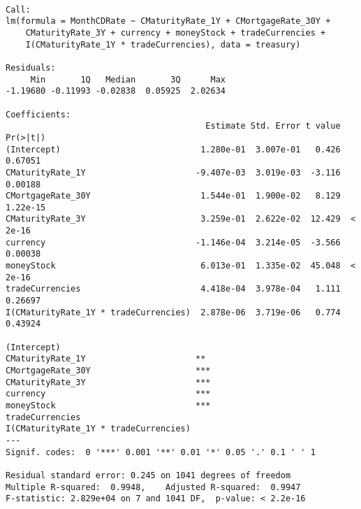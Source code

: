 \documentclass[11pt]{article}
\begin{document}
    
    \begin{verbatim}

Call:
lm(formula = MonthCDRate ~ CMaturityRate_1Y + CMortgageRate_30Y + 
    CMaturityRate_3Y + currency + moneyStock + tradeCurrencies + 
    I(CMaturityRate_1Y * tradeCurrencies), data = treasury)

Residuals:
     Min       1Q   Median       3Q      Max 
-1.19680 -0.11993 -0.02838  0.05925  2.02634 

Coefficients:
                                        Estimate Std. Error t value Pr(>|t|)
(Intercept)                            1.280e-01  3.007e-01   0.426  0.67051
CMaturityRate_1Y                      -9.407e-03  3.019e-03  -3.116  0.00188
CMortgageRate_30Y                      1.544e-01  1.900e-02   8.129 1.22e-15
CMaturityRate_3Y                       3.259e-01  2.622e-02  12.429  < 2e-16
currency                              -1.146e-04  3.214e-05  -3.566  0.00038
moneyStock                             6.013e-01  1.335e-02  45.048  < 2e-16
tradeCurrencies                        4.418e-04  3.978e-04   1.111  0.26697
I(CMaturityRate_1Y * tradeCurrencies)  2.878e-06  3.719e-06   0.774  0.43924
                                         
(Intercept)                              
CMaturityRate_1Y                      ** 
CMortgageRate_30Y                     ***
CMaturityRate_3Y                      ***
currency                              ***
moneyStock                            ***
tradeCurrencies                          
I(CMaturityRate_1Y * tradeCurrencies)    
---
Signif. codes:  0 '***' 0.001 '**' 0.01 '*' 0.05 '.' 0.1 ' ' 1

Residual standard error: 0.245 on 1041 degrees of freedom
Multiple R-squared:  0.9948,	Adjusted R-squared:  0.9947 
F-statistic: 2.829e+04 on 7 and 1041 DF,  p-value: < 2.2e-16

    \end{verbatim}

    
    
\end{document}
